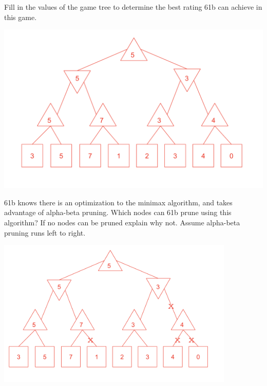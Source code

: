 \begin{parts}
\item Fill in the values of the game tree to determine the best rating 61b can achieve in this game.

\ifprintanswers
\begin{solution}[2in]
\begin{center}
    \includegraphics[width=.9\textwidth,height=.9\textheight,keepaspectratio]{topics/trees/game-trees/filled-minimax.png} \newline
 
\end{center}
\end{solution}
\fi


\item 61b knows there is an optimization to the minimax algorithm, and takes advantage of alpha-beta pruning. Which nodes can 61b prune using this algorithm? If no nodes can be pruned explain why not. Assume alpha-beta pruning runs left to right.

\ifprintanswers
\begin{solution}[2in]
\begin{center}
\includegraphics[width=0.85\textwidth]{topics/trees/game-trees/pruned-minimax.png} \newline
\end{center}
\end{solution}
\fi


\end{parts}
